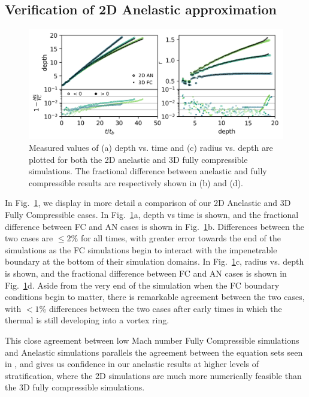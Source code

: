 \documentclass[twocolumn, amsmath, amsfonts, amssymb, trackchanges]{aastex62}
\begin{document}
\subsection{Verification of 2D Anelastic approximation}
\begin{figure}[t!]
    \includegraphics[width=\textwidth]{diff_AN_FC.png}
    \caption{
	Measured values of (a) depth vs. time and (c) radius vs. depth are plotted for both the 2D anelastic and 3D fully compressible simulations. 
	The fractional difference between anelastic and fully compressible results are respectively shown in (b) and (d).
    \label{fig:diff} }
\end{figure}

In Fig.~\ref{fig:diff}, we display in more detail a comparison of our 2D Anelastic and 3D Fully Compressible cases. 
In Fig.~\ref{fig:diff}a, depth vs time is shown, and the fractional difference between FC and AN cases is shown in Fig.~\ref{fig:diff}b.
Differences between the two cases are $\leq 2$\% for all times, with greater error towards the end of the simulations as the FC simulations begin to interact with the impenetrable boundary at the bottom of their simulation domains.  
In Fig.~\ref{fig:diff}c, radius vs. depth is shown, and the fractional difference between FC and AN cases is shown in Fig.~\ref{fig:diff}d. 
Aside from the very end of the simulation when the FC boundary conditions begin to matter, there is remarkable agreement between the two cases, with $< 1$\% differences between the two cases after early times in which the thermal is still developing into a vortex ring.

This close agreement between low Mach number Fully Compressible simulations and Anelastic simulations parallels the agreement between the equation sets seen in \citet{lecoanet&all2014}, and gives us confidence in our anelastic results at higher levels of stratification, where the 2D simulations are much more numerically feasible than the 3D fully compressible simulations.
\end{document}

